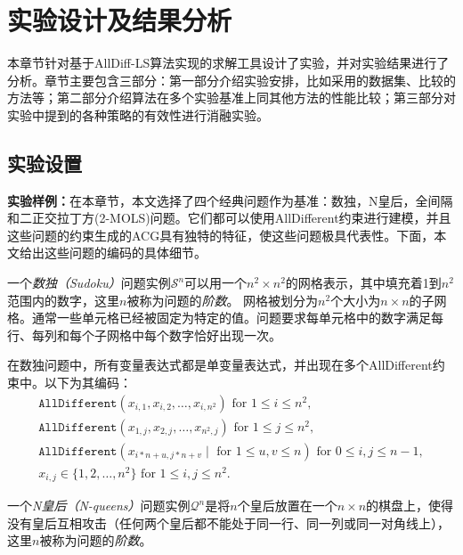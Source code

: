 \chapter{实验设计及结果分析}\label{chap:method}

本章节针对基于AllDiff-LS算法实现的求解工具设计了实验，并对实验结果进行了分析。章节主要包含三部分：第一部分介绍实验安排，比如采用的数据集、比较的方法等；第二部分介绍算法在多个实验基准上同其他方法的性能比较；第三部分对实验中提到的各种策略的有效性进行消融实验。

\section{实验设置}
\textbf{实验样例：}在本章节，本文选择了四个经典问题作为基准：数独，N皇后，全间隔和二正交拉丁方(2-MOLS)问题\cite{colbourn2001mutually}。它们都可以使用AllDifferent约束进行建模，并且这些问题的约束生成的ACG具有独特的特征，使这些问题极具代表性。下面，本文给出这些问题的编码的具体细节。

\begin{definition}[数独]
一个\textit{数独（Sudoku）}问题实例$\mathcal{S}^n$可以用一个$n^2 \times n^2$的网格表示，其中填充着1到$n^2$范围内的数字，这里$n$被称为问题的\textit{阶数}。
网格被划分为$n^2$个大小为$n \times n$的子网格。通常一些单元格已经被固定为特定的值。问题要求每单元格中的数字满足每行、每列和每个子网格中每个数字恰好出现一次。
\end{definition}

在数独问题中，所有变量表达式都是单变量表达式，并出现在多个AllDifferent约束中。以下为其编码：
\begin{align*}
    &\texttt {AllDifferent} (x_{i,1}, x_{i,2}, \dots, x_{i,n^2}) \text{  for } 1 \leq i \leq n^2, & \\
    &\texttt {AllDifferent} (x_{1,j}, x_{2,j}, \dots, x_{n^2,j}) \text{  for } 1 \leq j \leq n^2, & \\
    &\texttt {AllDifferent} (x_{i*n+u,j*n+v} \mid \text{ for } 1 \leq u,v \leq n) \text{  for } 0 \leq i, j \leq n-1, & \\
    &x_{i, j} \in\{1, 2, \dots, n^2\} \text { for } 1 \leq i, j \leq n^2.&
\end{align*}%

\begin{definition}[N皇后]
一个\textit{N皇后（N-queens）}问题实例$\mathcal{Q}^n$是将$n$个皇后放置在一个$n \times n$的棋盘上，使得没有皇后互相攻击（任何两个皇后都不能处于同一行、同一列或同一对角线上），这里$n$被称为问题的\textit{阶数}。
\end{definition}

